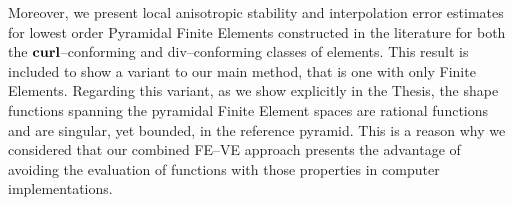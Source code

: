 Moreover, we present local anisotropic stability
and interpolation error estimates for lowest order Pyramidal
Finite Elements constructed in the literature for both
the $\textbf{curl}$--conforming and div--conforming classes of elements. This result
is included to show a variant to our main method, that is one 
with only Finite Elements. Regarding this variant, as we show
explicitly in the Thesis, the shape functions 
spanning the pyramidal Finite Element spaces are rational functions and are 
singular, yet bounded,
in the reference pyramid. This is a reason why we considered that
our combined FE--VE approach presents the advantage of avoiding the evaluation
of functions with those properties in computer implementations.